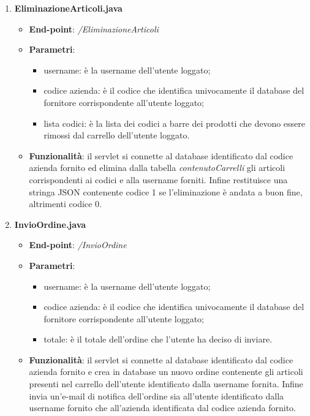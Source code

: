 \documentclass[12pt, a4paper, titlepage]{report}
\begin{document}
\begin{enumerate}
		\item \textbf{EliminazioneArticoli.java}
		\begin{itemize}
			\item \textbf{End-point}: \textit{/EliminazioneArticoli}
			\item \textbf{Parametri}:
			\begin{itemize}
				\item username: è la username dell'utente loggato;
				\item codice azienda: è il codice che identifica univocamente il database del fornitore corrispondente all'utente loggato;
				\item lista codici: è la lista dei codici a barre dei prodotti che devono essere rimossi dal carrello dell'utente loggato.
			\end{itemize}
			\item \textbf{Funzionalità}: il servlet si connette al database identificato dal codice azienda fornito ed elimina dalla tabella \textit{contenutoCarrelli} gli articoli corrispondenti ai codici e alla username forniti. Infine restituisce una stringa JSON contenente codice 1 se l'eliminazione è andata a buon fine, altrimenti codice 0.
		\end{itemize}
	
		\item \textbf{InvioOrdine.java}
		\begin{itemize}
			\item \textbf{End-point}: \textit{/InvioOrdine}
			\item \textbf{Parametri}:
			\begin{itemize}
				\item username: è la username dell'utente loggato;
				\item codice azienda: è il codice che identifica univocamente il database del fornitore corrispondente all'utente loggato;
				\item totale: è il totale dell'ordine che l'utente ha deciso di inviare.
			\end{itemize}
			\item \textbf{Funzionalità}: il servlet si connette al database identificato dal codice azienda fornito e crea in database un nuovo ordine contenente gli articoli presenti nel carrello dell'utente identificato dalla username fornita. Infine invia un'e-mail di notifica dell'ordine sia all'utente identificato dalla username fornito che all'azienda identificata dal codice azienda fornito.
		\end{itemize}
	

\end{enumerate}
\end{document}
